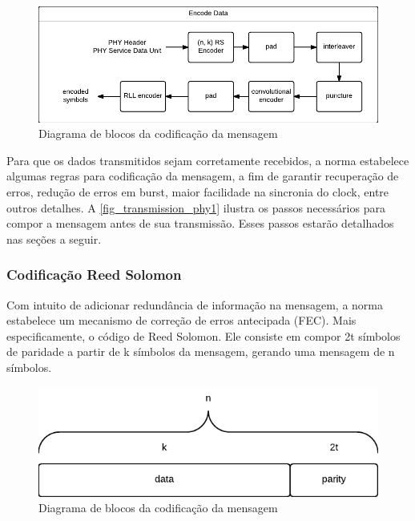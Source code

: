 		\begin{figure}[htb]
			\caption{\label{fig_transmission_phy1} Diagrama de blocos da codificação da mensagem}
			\centering
			\includegraphics[width=0.6\textheight]{PHY1-transmission.pdf}
		\end{figure}
		
	Para que os dados transmitidos sejam corretamente recebidos, a norma estabelece algumas regras para codificação da mensagem, a fim de garantir recuperação de erros, redução de erros em burst, maior facilidade na sincronia do clock, entre outros detalhes. A \autoref{fig_transmission_phy1} ilustra os passos necessários para compor a mensagem antes de sua transmissão. Esses passos estarão detalhados nas seções a seguir.
	
	\subsubsection{Codificação Reed Solomon}
	
	Com intuito de adicionar redundância de informação na mensagem, a norma estabelece um mecanismo de correção de erros antecipada (FEC). Mais especificamente, o código de Reed Solomon. Ele consiste em compor 2t símbolos de paridade a partir de k símbolos da mensagem, gerando uma mensagem de n símbolos. \cite{nasa-rs1}

	\begin{figure}[htb]
		\caption{\label{fig_reed_solomon_message} Diagrama de blocos da codificação da mensagem}
		\centering
		\includegraphics[width=0.5\textheight]{reed_solomon_message.pdf}
	\end{figure}	
	
